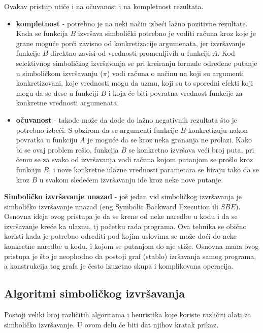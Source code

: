 \documentclass[12pt]{article}
\begin{document}
Ovakav pristup utiče i na očuvanost i na kompletnost rezultata.

\begin{itemize}
    \item \textbf{kompletnost} - potrebno je na neki način izbeći lažno pozitivne rezultate. Kada se funkcija $B$ izvršava simbolički potrebno je voditi računa kroz koje je grane moguće porći zavisno od konkretizacije argumenata, jer izvršavanje funkcije $B$ direktno zavisi od vrednosti promenljivih u funkciji $A$. Kod selektivnog simboličkog izvršavanja se pri kreiranju formule određene putanje u simboličkom izvršavanju ($\pi$) vodi računa o načinu na koji su argumenti konkretizovani, koje vrednosti mogu da uzmu, koji su to sporedni efekti koji mogu da se dese u funkciji $B$ i koja će biti povratna vrednost funkcije za konkretne vrednosti argumenata.
    
    \item \textbf{očuvanost} - takođe može da dođe do lažno negativnih rezultata što je potrebno izbeći. S obzirom da se argumenti funkcije $B$ konkretizuju nakon povratka u funkciju $A$ je moguće da se kroz neka grananja ne prolazi. Kako bi se ovaj problem rešio, funkcija $B$ se konkretno izvršava veći broj puta, pri čemu se za svako od izvršavanja vodi računa kojom putanjom se prošlo kroz funkciju $B$, i nove konkretne ulazne vrednosti parametara se biraju tako da se kroz $B$ u svakom sledećem izvršavanju ide kroz neke nove putanje.
\end{itemize} 
\bigskip
\textbf{Simboličko izvršavanje unazad} - još jedan vid simboličkog izvršavanja je simboličko izvršavanje unazad (eng Symbolic Backward Execution ili $SBE$). Osnovna ideja ovog pristupa je da se krene od neke naredbe u kodu i da se izvršavanje kreće ka ulaznu, tj početku rada programa. Ova tehnika se obično koristi kada je potrebno odrediti pod kojim uslovima se može doći do neke konkretne naredbe u kodu, i kojom se putanjom do nje stiže. Osnovna mana ovog pristupa je što je neophodno da postoji graf (stablo) izršavanja samog programa, a konstrukcija tog grafa je često izuzetno skupa i komplikovana operacija.

\subsection{Algoritmi simboličkog izvršavanja}

Postoji veliki broj različitih algoritama i heuristika koje koriste različiti alati za simboličko izvršavanje. U ovom delu će biti dat njihov kratak prikaz.
\end{document}
